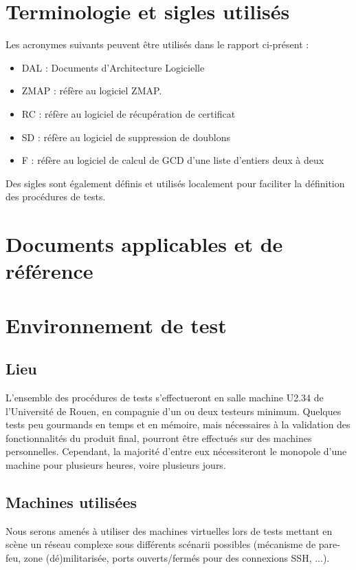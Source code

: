 \documentclass[a4paper,11pt,french]{article}
\begin{document}
\section{Terminologie et sigles utilisés}
Les acronymes suivants peuvent être utilisés dans le rapport ci-présent :
\begin{itemize}
\item DAL :  Documents d'Architecture Logicielle
\item ZMAP : réfère au logiciel ZMAP.
\item RC : réfère au logiciel de récupération de certificat
\item SD : réfère au logiciel de suppression de doublons
\item F : réfère au logiciel de calcul de GCD d'une liste d'entiers deux à deux
\end{itemize}
Des sigles sont également définis et utilisés localement pour faciliter la définition des procédures de tests.

\section{Documents applicables et de référence}

\section{Environnement de test}

\subsection{Lieu}

L'ensemble des procédures de tests s'effectueront en salle machine U2.34 de l'Université de Rouen, en compagnie d'un ou deux testeurs minimum. Quelques tests peu gourmands en temps et en mémoire, mais nécessaires à la validation des fonctionnalités du produit final, pourront être effectués sur des machines personnelles.
Cependant, la majorité d'entre eux nécessiteront le monopole d'une machine pour plusieurs heures, voire plusieurs jours.

\subsection{Machines utilisées}

Nous serons amenés à utiliser des machines virtuelles lors de tests mettant en scène un réseau complexe sous différents scénarii possibles (mécanisme de pare-feu, zone (dé)militarisée, ports ouverts/fermés pour des connexions SSH, ...). \\
\end{document}
